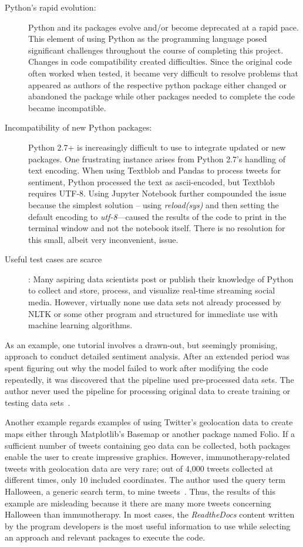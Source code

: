 \begin{description}
\item[Python's rapid evolution:]
Python and its packages evolve and/or become
deprecated at a rapid pace.  This element of using
Python as the programming language posed
significant challenges throughout the course of
completing this project.  Changes in code compatibility created 
difficulties.  Since the original code often worked when tested, it 
became very difficult to resolve problems that appeared as authors of the
respective python package either changed or
abandoned the package while other packages needed to 
complete the code became incompatible.

\item[Incompatibility of new Python packages:] 
Python 2.7+ is increasingly difficult to use to
integrate updated or new packages.  One
frustrating instance arises from Python 2.7's
handling of text encoding.  When using Textblob
and Pandas to process tweets for sentiment, Python
processed the text as ascii-encoded, but Textblob
requires UTF-8.  Using Jupyter Notebook further
compounded the issue because the simplest solution
– using \emph{reload(sys)} and then setting the default
encoding to \emph{utf-8}—caused the results of the
code to print in the terminal window and not the
notebook itself.  There is no resolution for this
small, albeit very inconvenient, issue. 

\item[Useful test cases are scarce]: 
Many aspiring data scientists post or publish
their knowledge of Python to collect and store,
process, and visualize real-time streaming social
media.  However, virtually none use data sets not
already processed by NLTK or some other program and
structured for immediate use with machine
learning algorithms.  
\end{description}

As an example, one tutorial involves a drawn-out,
but seemingly promising, approach to conduct
detailed sentiment analysis.  After an extended period was 
spent figuring out why the model failed to
work after modifying the code repeatedly,  it was discovered that
the pipeline used pre-processed data sets.  The author never used
the pipeline for processing original data to
create training or testing data sets~\cite{cranfill2017}.    

Another example regards examples of using Twitter's 
geolocation data to create maps either through Matplotlib's 
Basemap or another package named Folio. If a
sufficient number of tweets containing geo data can be 
collected, both packages enable the user to create impressive 
graphics.  However, immunotherapy-related tweets
with geolocation data are very rare; out of 4,000 tweets
collected at different times, only 10 included
coordinates.  The author used the query term
Halloween, a generic search term, to mine tweets~\cite{ianbroad2014}.
Thus, the results of this example are
misleading because it there are many more tweets
concerning Halloween than immunotherapy.  In most
cases, the \emph{ReadtheDocs} content written by
the program developers is the most useful
information to use while selecting an approach and
relevant packages to execute the code.  

